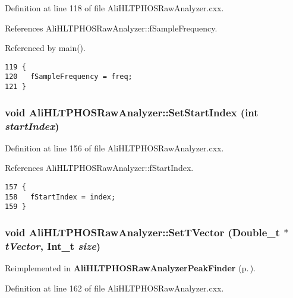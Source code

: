 Definition at line 118 of file Ali\-HLTPHOSRaw\-Analyzer.cxx.

References Ali\-HLTPHOSRaw\-Analyzer::f\-Sample\-Frequency.

Referenced by main().

\footnotesize\begin{verbatim}119 {
120   fSampleFrequency = freq;
121 }
\end{verbatim}\normalsize 


\subsubsection{\setlength{\rightskip}{0pt plus 5cm}void Ali\-HLTPHOSRaw\-Analyzer::Set\-Start\-Index (int {\em start\-Index})\hspace{0.3cm}{\tt  [inherited]}}\label{classAliHLTPHOSRawAnalyzer_AliHLTPHOSRawAnalyzerPeakFindera14}




Definition at line 156 of file Ali\-HLTPHOSRaw\-Analyzer.cxx.

References Ali\-HLTPHOSRaw\-Analyzer::f\-Start\-Index.

\footnotesize\begin{verbatim}157 {
158   fStartIndex = index;
159 }
\end{verbatim}\normalsize 


\subsubsection{\setlength{\rightskip}{0pt plus 5cm}void Ali\-HLTPHOSRaw\-Analyzer::Set\-TVector (Double\_\-t $\ast$ {\em t\-Vector}, Int\_\-t {\em size})\hspace{0.3cm}{\tt  [virtual, inherited]}}\label{classAliHLTPHOSRawAnalyzer_AliHLTPHOSRawAnalyzerLMSa16}




Reimplemented in {\bf Ali\-HLTPHOSRaw\-Analyzer\-Peak\-Finder} {\rm (p.\,\pageref{classAliHLTPHOSRawAnalyzerPeakFinder_AliHLTPHOSRawAnalyzerPeakFindera4})}.

Definition at line 162 of file Ali\-HLTPHOSRaw\-Analyzer.cxx.

